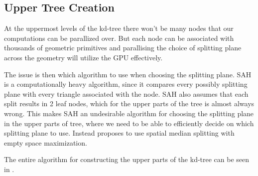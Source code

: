 \subsection{Upper Tree Creation}\label{sec:upperNodes}


At the uppermost levels of the kd-tree there won't be many nodes that
our computations can be parallized over. But each node can be
associated with thousands of geometric primitives and parallising the
choice of splitting plane across the geometry will utilize the GPU
effectively.


The issue is then which algorithm to use when choosing the splitting
plane. SAH is a computationally heavy algorithm, since it compares
every possibly splitting plane with every triangle associated with the
node. SAH also assumes that each split results in 2 leaf nodes, which
for the upper parts of the tree is almost always wrong. This makes SAH
an undesirable algorithm for choosing the splitting plane in the upper
parts of tree, where we need to be able to efficiently decide on which
splitting plane to use. Instead \zhou{} proposes to use spatial median
splitting with empty space maximization.

The entire algorithm for constructing the upper parts of the kd-tree
can be seen in .

